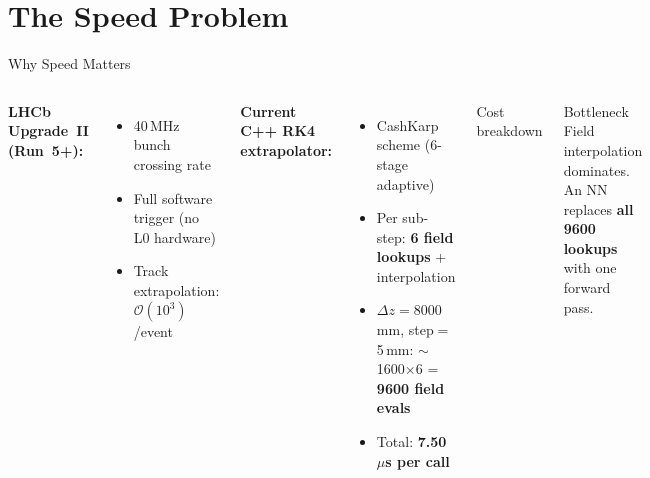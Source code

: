 \documentclass[aspectratio=169, 11pt]{beamer}
\begin{document}
\section{The Speed Problem}

\begin{frame}{Why Speed Matters}
  \begin{columns}[T]
    \textbf{LHCb Upgrade~II (Run~5+):}
    \begin{itemize}\setlength{\itemsep}{2pt}
      \item 40\,MHz bunch crossing rate
      \item Full software trigger (no L0 hardware)
      \item Track extrapolation: $\mathcal{O}(10^3)$/event
    \end{itemize}

    \smallskip
    \textbf{Current C++ RK4 extrapolator:}
    \begin{itemize}\setlength{\itemsep}{2pt}
      \item CashKarp scheme (6-stage adaptive)
      \item Per sub-step: \textbf{6 field lookups} + interpolation
      \item $\Delta z{=}8000$\,mm, step${=}$5\,mm:
            $\sim$1600$\times$6 = \textbf{9600 field evals}
      \item Total: \textbf{7.50\,$\mu$s per call}
    \end{itemize}

    \begin{block}{Cost breakdown}
      \centering
    \end{block}
    \begin{alertblock}{Bottleneck}
      \small Field interpolation dominates. An NN replaces \textbf{all 9600 lookups} with one forward pass.
    \end{alertblock}
  \end{columns}
\end{frame}
\end{document}
